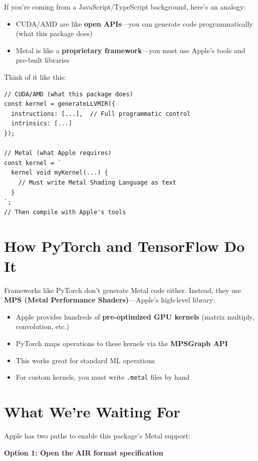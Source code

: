 \documentclass[11pt,oneside]{book}
\begin{document}
If you're coming from a JavaScript/TypeScript background, here's an analogy:

\begin{itemize}[noitemsep]
  \item CUDA/AMD are like \textbf{open APIs}—you can generate code programmatically (what this package does)
  \item Metal is like a \textbf{proprietary framework}—you must use Apple's tools and pre-built libraries
\end{itemize}

Think of it like this:
\begin{lstlisting}[style=ts]
// CUDA/AMD (what this package does)
const kernel = generateLLVMIR({
  instructions: [...],  // Full programmatic control
  intrinsics: [...]
});

// Metal (what Apple requires)
const kernel = `
  kernel void myKernel(...) {
    // Must write Metal Shading Language as text
  }
`;
// Then compile with Apple's tools
\end{lstlisting}

\section{How PyTorch and TensorFlow Do It}

Frameworks like PyTorch don't generate Metal code either. Instead, they use \textbf{MPS (Metal Performance Shaders)}\cite{pytorchmps}\cite{applepytorch}—Apple's high-level library:

\begin{itemize}[noitemsep]
  \item Apple provides hundreds of \textbf{pre-optimized GPU kernels} (matrix multiply, convolution, etc.)\cite{metaldocs}
  \item PyTorch maps operations to these kernels via the \textbf{MPSGraph API}
  \item This works great for standard ML operations
  \item For custom kernels, you must write \texttt{.metal} files by hand\cite{metalspec}
\end{itemize}

\section{What We're Waiting For}

Apple has two paths to enable this package's Metal support:

\textbf{Option 1: Open the AIR format specification}
\end{document}
